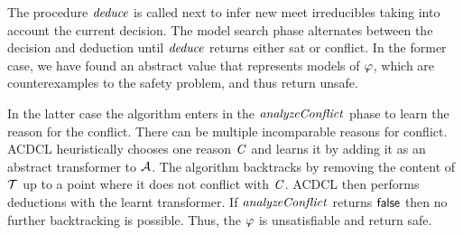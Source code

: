 The procedure $\mathit{deduce}$ is called next to infer new meet irreducibles
taking into account the current decision.  The model search phase
alternates between the decision and deduction until $\mathit{deduce}$ returns
either \textsf{sat} or \textsf{conflict}.  In the former case, we have
found an abstract value that represents models of $\varphi$, which
are counterexamples to the safety problem, and thus  return
\textsf{unsafe}.
%

In the latter case the algorithm enters in the $\mathit{analyzeConflict}$
phase to learn the reason for the conflict.   There can be multiple
incomparable reasons for conflict.
ACDCL heuristically chooses one reason $\mathit{C}$ and learns it 
by adding it as an abstract transformer to $\mathcal{A}$. The algorithm 
backtracks by removing the content of $\mathcal{T}$ up to a point where it does not 
conflict with $\mathit{C}$.  ACDCL then performs deductions with the learnt 
transformer.  If $\mathit{analyzeConflict}$ returns $\mathsf{false}$ then no further
backtracking is possible.  Thus, the $\varphi$ is unsatisfiable
and  return \textsf{safe}.


